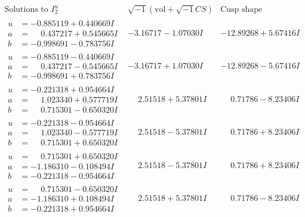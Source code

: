 \documentclass[1p]{elsarticle_modified}
\theoremstyle{definition}
\newcommand{\I}{\sqrt{-1}}
\begin{document}
$$\begin{array}{c|c|c}  
\text{Solutions to }I^u_{2}& \I (\text{vol} + \sqrt{-1}CS) & \text{Cusp shape}\\
 \hline 
\begin{aligned}
u &= -0.885119 + 0.440669 I \\
a &= \phantom{-}0.437217 + 0.545665 I \\
b &= -0.998691 - 0.783756 I\end{aligned}
 & -3.16717 - 1.07030 I & -12.89268 + 5.67416 I \\ \hline\begin{aligned}
u &= -0.885119 - 0.440669 I \\
a &= \phantom{-}0.437217 - 0.545665 I \\
b &= -0.998691 + 0.783756 I\end{aligned}
 & -3.16717 + 1.07030 I & -12.89268 - 5.67416 I \\ \hline\begin{aligned}
u &= -0.221318 + 0.954664 I \\
a &= \phantom{-}1.023340 + 0.577719 I \\
b &= \phantom{-}0.715301 - 0.650320 I\end{aligned}
 & \phantom{-}2.51518 + 5.37801 I & \phantom{-}0.71786 - 8.23406 I \\ \hline\begin{aligned}
u &= -0.221318 - 0.954664 I \\
a &= \phantom{-}1.023340 - 0.577719 I \\
b &= \phantom{-}0.715301 + 0.650320 I\end{aligned}
 & \phantom{-}2.51518 - 5.37801 I & \phantom{-}0.71786 + 8.23406 I \\ \hline\begin{aligned}
u &= \phantom{-}0.715301 + 0.650320 I \\
a &= -1.186310 - 0.108494 I \\
b &= -0.221318 - 0.954664 I\end{aligned}
 & \phantom{-}2.51518 - 5.37801 I & \phantom{-}0.71786 + 8.23406 I \\ \hline\begin{aligned}
u &= \phantom{-}0.715301 - 0.650320 I \\
a &= -1.186310 + 0.108494 I \\
b &= -0.221318 + 0.954664 I\end{aligned}
 & \phantom{-}2.51518 + 5.37801 I & \phantom{-}0.71786 - 8.23406 I \\ \hline\begin{aligned}

\end{aligned}
\end{array}$$
\end{document}
